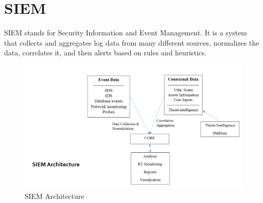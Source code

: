 \section{SIEM}
\begin{paracol}{2}
   SIEM stands for Security Information and Event Management. It is a system that
   collects and aggregates log data from many different sources, normalizes the
   data, correlates it, and then alerts based on rules and heuristics.
   
   \switchcolumn

   \begin{figure}[htbp]
      \centering
      \includegraphics{images/04/SIEM.png}
      \caption{SIEM Architecture}
      \label{fig:04/SIEM}
   \end{figure}

\end{paracol}